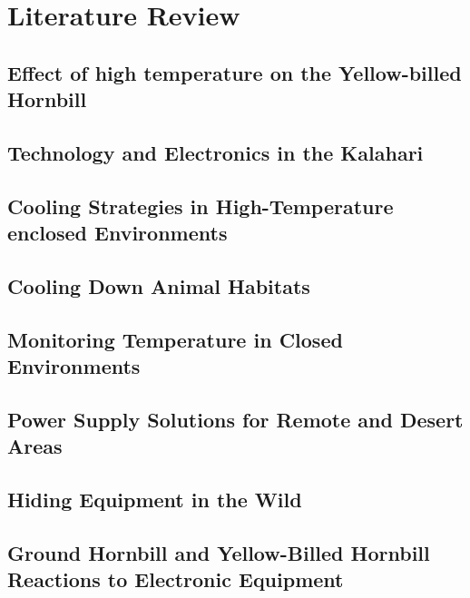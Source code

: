 \documentclass[class=report,11pt,crop=false]{standalone}
\begin{document}
\ifstandalone
\tableofcontents
\fi
\chapter{Literature Review \label{ch:literature}}

\section{Effect of high temperature on the Yellow-billed Hornbill}

\section{Technology and Electronics in the Kalahari}

\section{Cooling Strategies in High-Temperature enclosed Environments}

\section{Cooling Down Animal Habitats}

\section{Monitoring Temperature in Closed Environments}

\section{Power Supply Solutions for Remote and Desert Areas}

\section{Hiding Equipment in the Wild}

\section{Ground Hornbill and Yellow-Billed Hornbill Reactions to Electronic Equipment}


\ifstandalone

\printnoidxglossary[type=\acronymtype,nonumberlist]
\fi
\end{document}
